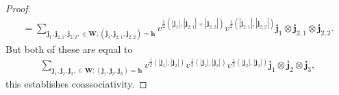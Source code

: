 \begin{proof}
\begin{gather*}
=\sum\limits_{\mathbf{j}_1,\mathbf{j}_{2,1},\mathbf{j}_{2,2},\in\mathbf{W}:(\mathbf{j}_1,\mathbf{j}_{2,1},\mathbf{j}_{2,2})=\mathbf{h}}
v^{\frac{1}{2}(|\mathbf{j}_1|,|\mathbf{j}_{2,1}|+|\mathbf{j}_{2,2}|)}v^{\frac{1}{2}(|\mathbf{j}_{2,1}|,|\mathbf{j}_{2,2}|)}
\mathbf{j}_1\otimes\mathbf{j}_{2,1}\otimes\mathbf{j}_{2,2}.
\end{gather*}
But both of these are equal to
\begin{gather*}
\sum\limits_{\mathbf{j}_1,\mathbf{j}_2,\mathbf{j}_3,\in\mathbf{W}:(\mathbf{j}_1,\mathbf{j}_2,\mathbf{j}_3)=\mathbf{h}}
v^{\frac{1}{2}(|\mathbf{j}_1|,|\mathbf{j}_2|)}v^{\frac{1}{2}(|\mathbf{j}_1|,|\mathbf{j}_3|)}
v^{\frac{1}{2}(|\mathbf{j}_2|,|\mathbf{j}_3|)}\mathbf{j}_1\otimes\mathbf{j}_2\otimes\mathbf{j}_3,
\end{gather*}
this establishes coassociativity.


\end{proof}
